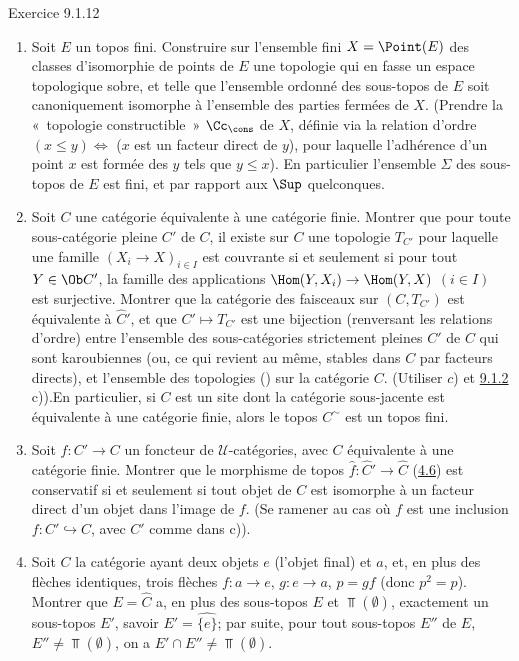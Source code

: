 \documentclass[10pt]{../fichiers-configuration-latex/smfart}
\begin{document}
\begin{enonce*}[remark]{Exercice 9.1.12}
\begin{enumerate}
\item Soit $E$ un topos fini. Construire sur l'ensemble fini
$X=\Point(E)$ des classes d'isomorphie de points de $E$ une
topologie qui en fasse un espace topologique sobre, et telle que
l'ensemble ordonné des sous-topos de $E$ soit canoniquement
isomorphe à l'ensemble des parties fermées de $X$. (Prendre la « topologie constructible »  $\Cc_{\cons}$ de $X$, définie via la
relation d'ordre $(x\leq y)\Leftrightarrow$ ($x$ est un facteur
direct de $y$), pour laquelle l'adhérence d'un point $x$ est formée
des $y$ tels que $y\leq x$). En particulier l'ensemble $\Sigma$ des
sous-topos de $E$ est fini, et  par
rapport aux $\Sup$ quelconques.

\item Soit $C$ une catégorie équivalente à une catégorie
finie. Montrer que pour toute sous-catégorie pleine $C'$ de $C$, il
existe sur $C$ une topologie $T_{C'}$ pour laquelle une famille
$(X_i\rightarrow X)_{i\in I}$ est couvrante si et seulement si pour
tout $Y\in \Ob C'$, la famille des applications
$\Hom(Y,X_i)\rightarrow \Hom(Y,X)$ $(i\in I)$ est surjective.
Montrer que la catégorie des faisceaux sur $(C,T_{C'})$ est
équivalente à $\widehat{C}'$, et que $C'\mapsto T_{C'}$ est une
bijection (renversant les relations d'ordre) entre l'ensemble des
sous-catégories strictement pleines $C'$ de $C$ qui sont
karoubiennes (ou, ce qui revient au même, stables dans $C$ par
facteurs directs), et l'ensemble des topologies ()
sur la catégorie $C$. (Utiliser $c$) et \hyperref[IV.rem9.1.2]{9.1.2}
c)).\pageoriginale En particulier, si $C$ est un site dont la
catégorie sous-jacente est équivalente à une catégorie finie, alors
le topos $C^{\sim}$ est un topos fini.

\item Soit $f:C'\rightarrow C$ un foncteur de $𝒰$-catégories, avec
$C$ équivalente à une catégorie finie. Montrer que le morphisme de
topos $\widehat{f}:\widehat{C}'\rightarrow \widehat{C}$
(\hyperref[IV.subsec4.6]{4.6}) est conservatif si et seulement si tout objet
de $C$ est isomorphe à un facteur direct d'un objet dans l'image de
$f$. (Se ramener au cas où $f$ est une inclusion
$f:C'\hookrightarrow C$, avec $C'$ comme dans c)).

\item Soit $C$ la catégorie ayant deux objets $e$ (l'objet final) et
$a$, et, en plus des flèches identiques, trois flèches
$f:a\rightarrow e$, $g:e\rightarrow a$, $p=gf$ (donc $p^2=p$).
Montrer que $E=\widehat{C}$ a, en plus des sous-topos $E$ et
$\Top(∅)$, exactement un sous-topos $E'$, savoir
$E'=\widehat{\{e\}}$; par suite, pour tout sous-topos $E''$ de $E$,
$E''\neq \Top(∅)$, on a $E'\cap E''\neq \Top(∅)$.
\end{enumerate}
\end{enonce*}
\end{document}
